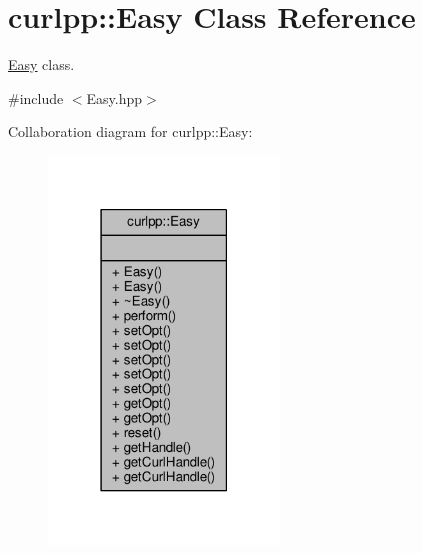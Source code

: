 \hypertarget{classcurlpp_1_1Easy}{\section{curlpp\-:\-:Easy Class Reference}
\label{classcurlpp_1_1Easy}
}


\hyperlink{classcurlpp_1_1Easy}{Easy} class.  




{\ttfamily \#include $<$Easy.\-hpp$>$}



Collaboration diagram for curlpp\-:\-:Easy\-:
\nopagebreak
\begin{figure}[H]
\begin{center}
\leavevmode
\includegraphics[width=174pt]{classcurlpp_1_1Easy__coll__graph}
\end{center}
\end{figure}
